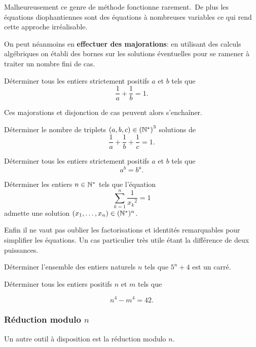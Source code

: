 Malheureusement ce genre de méthode fonctionne rarement. De plus les équations diophantiennes sont des équations à nombreuses variables ce qui rend cette approche irréalisable.

On peut néanmoins en \textbf{effectuer des majorations}: en utilisant des calculs algébriques on établi des bornes sur les solutions éventuelles pour se ramener à traiter un nombre fini de cas.


\begin{exo}
  Déterminer tous les entiers strictement positifs $a$ et $b$ tels que
  $$\frac{1}{a} + \frac{1}{b} = 1.$$
\end{exo}


Ces majorations et disjonction de cas peuvent alors s'enchaîner.
\begin{exo}
  Déterminer le nombre de triplets $(a,b,c) \in \left(\mathbb N^* \right)^3$ solutions de
  $$\frac{1}{a} + \frac{1}{b} + \frac{1}{c} = 1.$$
\end{exo}

\begin{exo}
  Déterminer tous les entiers strictement positifs $a$ et $b$ tels que
  $$a^b = b^a.$$
\end{exo}

\begin{exo}[CG 90]
  Déterminer les entiers $n \in \mathbb N^*$ tels que l'équation
  $$ \sum_{k=1}^n \frac{1}{{x_k}^2}= 1$$
  admette une solution $(x_1,\ldots,x_n) \in (\mathbb N^*)^n$.
\end{exo}

Enfin il ne vaut pas oublier les factorisations et identités remarquables pour simplifier les équations. Un cas particulier très utile étant la différence de deux puissances.

\begin{exo}
  Déterminer l'ensemble des entiers naturels $n$ tels que $5^n + 4$ est un carré.
\end{exo}

\begin{exo}
  Déterminer tous les entiers positifs $n$ et $m$ tels que

  $$n^4-m^4 = 42.$$
\end{exo}

\subsubsection{Réduction modulo $n$}

Un autre outil à disposition est la réduction modulo $n$.

